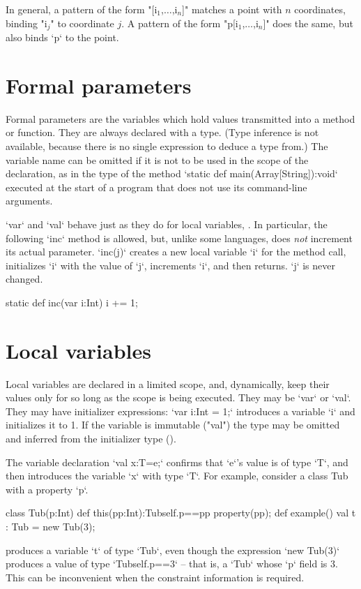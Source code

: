 In general, a pattern of the form \xcdmath"[i$_1$,$\ldots$,i$_n$]" matches a
point with {$n$} coordinates, binding \xcdmath"i$_j$" to coordinate {$j$}.  
A pattern of the form \xcdmath"p[i$_1$,$\ldots$,i$_n$]" does the same,  but
also binds \xcd`p` to the point.

\section{Formal parameters}
\label{sect:formal-parameters}


Formal parameters are the variables which hold values transmitted into a
method or function.  
They are always declared with a type.  (Type inference is not
available, because there is no single expression to deduce a type from.)
The variable name can be omitted if it is not to be used in the
scope of the declaration, as in the type of the method 
\xcd`static def main(Array[String]):void` executed at the start of a program that
does not use its command-line arguments.

\xcd`var` and \xcd`val` behave just as they do for local
variables, .  In particular, the following \xcd`inc`
method is allowed, but, unlike some languages, does {\em not} increment its
actual parameter.  \xcd`inc(j)` creates a new local 
variable \xcd`i` for the method call, initializes \xcd`i` with the value of
\xcd`j`, increments \xcd`i`, and then returns.  \xcd`j` is never changed.
\begin{xten}
static def inc(var i:Int) { i += 1; }
\end{xten}


\section{Local variables}\label{local-variables}
Local variables are declared in a limited scope, and, dynamically, keep their
values only for so long as the scope is being executed.  They may be \xcd`var`
or \xcd`val`.  
They may have 
initializer expressions: \xcd`var i:Int = 1;` introduces 
a variable \xcd`i` and initializes it to 1.
If the variable is immutable
(\xcd"val")
the type may be omitted and
inferred from the initializer type ().

The variable declaration \xcd`val x:T=e;` confirms that \xcd`e`'s value is of
type \xcd`T`, and then introduces the variable \xcd`x` with type \xcd`T`.  For
example, consider a class Tub with a property \xcd`p`.
\begin{xten}
class Tub(p:Int){
  def this(pp:Int):Tub{self.p==pp} {property(pp);}
  def example() {
    val t : Tub = new Tub(3);
  }
}
\end{xten}
%
\noindent
produces a variable \xcd`t` of type \xcd`Tub`, even though the expression
\xcd`new Tub(3)` produces a value of type \xcd`Tub{self.p==3}` -- that is, a
\xcd`Tub`  whose \xcd`p` field is 3.  This can be inconvenient when the
constraint information is required.

